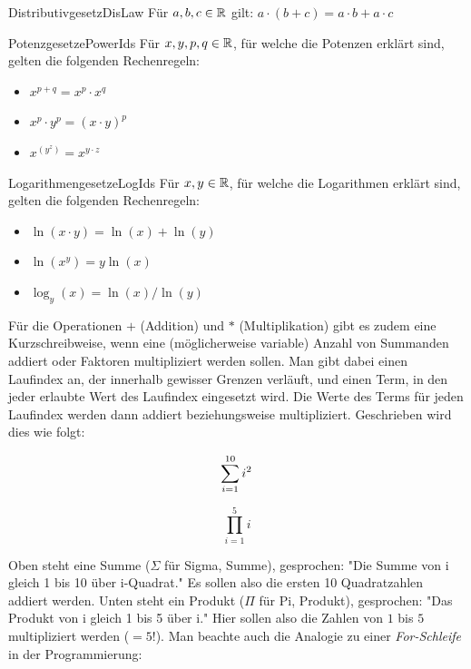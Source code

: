 \begin{statement}{Distributivgesetz}{DisLaw}
	Für $a,b,c\in\mathbb{R}$ gilt: $a \cdot ( b + c ) = a \cdot b + a \cdot c$
\end{statement}

\begin{statement}{Potenzgesetze}{PowerIds}
	Für $x, y, p,q\in\mathbb{R}$, für welche die Potenzen erklärt sind, gelten die folgenden Rechenregeln:
	\begin{itemize}
		\item $x^{p+q} = x^p \cdot x^q$
		\item $x^p \cdot y^p = (x \cdot y)^p$
		\item $x^{(y^z)} = x^{y \cdot z}$
	\end{itemize}
\end{statement}

\begin{statement}{Logarithmengesetze}{LogIds}
	Für $x, y\in\mathbb{R}$, für welche die Logarithmen erklärt sind, gelten die folgenden Rechenregeln:
	\begin{itemize}
		\item $\ln(x \cdot y) = \ln(x) + \ln(y)$
		\item $\ln(x^y) = y \ln(x)$
		\item $\log_y(x) = \ln(x) / \ln(y)$
	\end{itemize}
\end{statement}

Für die Operationen $+$ (Addition) und $*$ (Multiplikation) gibt es zudem eine Kurzschreibweise, wenn eine (möglicherweise variable) Anzahl von Summanden addiert oder Faktoren multipliziert werden sollen. Man gibt dabei einen Laufindex an, der innerhalb gewisser Grenzen verläuft, und einen Term, in den jeder erlaubte Wert des Laufindex eingesetzt wird. Die Werte des Terms für jeden Laufindex werden dann addiert beziehungsweise multipliziert. Geschrieben wird dies wie folgt:

$$
\sum\limits_{i=1}^{10} i^2  \\
$$

$$
\prod\limits_{i=1}^{5} i
$$

Oben steht eine Summe ($\Sigma$ für Sigma, Summe), gesprochen: "Die Summe von i gleich 1 bis 10 über i-Quadrat." Es sollen also die ersten 10 Quadratzahlen addiert werden. Unten steht ein Produkt ($\Pi$ für Pi, Produkt), gesprochen: "Das Produkt von i gleich 1 bis 5 über i." Hier sollen also die Zahlen von $1$ bis $5$ multipliziert werden ($=5!$). Man beachte auch die Analogie zu einer \emph{For-Schleife} in der Programmierung:

